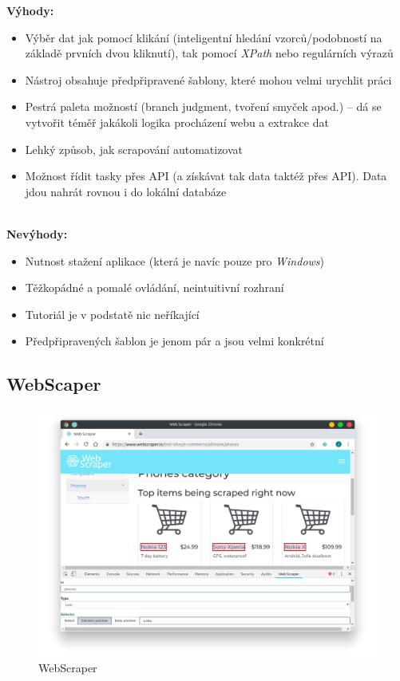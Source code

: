 \documentclass[thesis=B,czech]{FITthesis}[2012/06/26]
\begin{document}
\textbf{Výhody:}
\begin{itemize}
	\item Výběr dat jak pomocí klikání (inteligentní hledání vzorců/podobností na základě prvních dvou kliknutí), tak pomocí \emph{XPath} nebo regulárních výrazů
	\item Nástroj obsahuje předpřipravené šablony, které mohou velmi urychlit práci
	\item Pestrá paleta možností (branch judgment, tvoření smyček apod.) -- dá se vytvořit téměř jakákoli logika procházení webu a extrakce dat
	\item Lehký způsob, jak scrapování automatizovat
	\item Možnost řídit tasky přes API (a získávat tak data taktéž přes API). Data jdou nahrát rovnou i do lokální databáze\\\\
\end{itemize}

\textbf{Nevýhody:}
\begin{itemize}
	\item Nutnost stažení aplikace (která je navíc pouze pro \emph{Windows})
	\item Těžkopádné a pomalé ovládání, neintuitivní rozhraní
	\item Tutoriál je v podstatě nic neříkající
	\item Předpřipravených šablon je jenom pár a jsou velmi konkrétní
\end{itemize}


\newpage
\subsection{WebScaper}
\begin{figure}[h]
	\includegraphics[width=\linewidth]{images/WebScraper.png}
	\caption{WebScraper}
	\label{fig:webScraper}
\end{figure}
\end{document}
